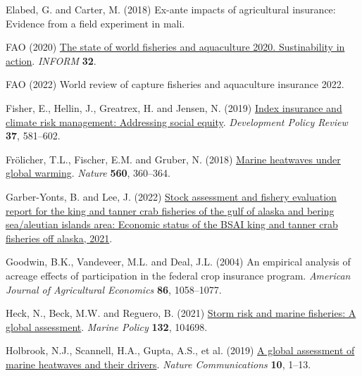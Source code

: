\documentclass[
  letterpaper,
  DIV=11,
  numbers=noendperiod]{scrartcl}
\newlength{\cslhangindent}
\newlength{\cslentryspacingunit} %
\newenvironment{CSLReferences}[2] %
 {%
  \setlength{\parindent}{0pt}
  \ifodd #1
  \let\oldpar\par
  \def\par{\hangindent=\cslhangindent\oldpar}
  \fi
  \setlength{\parskip}{#2\cslentryspacingunit}
 }%
 {}
\theoremstyle{plain}
\theoremstyle{plain}
\theoremstyle{remark}
\begin{document}
\begin{CSLReferences}{1}{0}
\leavevmode{}%
Elabed, G. and Carter, M. (2018) Ex-ante impacts of agricultural
insurance: Evidence from a field experiment in mali.

\leavevmode{}%
FAO (2020) \href{https://doi.org/10.4060/ca9229en}{The state of world
fisheries and aquaculture 2020. Sustinability in action}. \emph{INFORM}
\textbf{32}.

\leavevmode{}%
FAO (2022) World review of capture fisheries and aquaculture insurance
2022.

\leavevmode{}%
Fisher, E., Hellin, J., Greatrex, H. and Jensen, N. (2019)
\href{https://doi.org/10.1111/dpr.12387}{Index insurance and climate
risk management: Addressing social equity}. \emph{Development Policy
Review} \textbf{37}, 581--602.

\leavevmode{}%
Frölicher, T.L., Fischer, E.M. and Gruber, N. (2018)
\href{https://doi.org/10.1038/s41586-018-0383-9}{Marine heatwaves under
global warming}. \emph{Nature} \textbf{560}, 360--364.

\leavevmode{}%
Garber-Yonts, B. and Lee, J. (2022)
\href{http://www.afsc.noaa.gov/refm/Socioeconomics/SAFE/default.php}{Stock
assessment and fishery evaluation report for the king and tanner crab
fisheries of the gulf of alaska and bering sea/aleutian islands area:
Economic status of the BSAI king and tanner crab fisheries off alaska,
2021}.

\leavevmode{}%
Goodwin, B.K., Vandeveer, M.L. and Deal, J.L. (2004) An empirical
analysis of acreage effects of participation in the federal crop
insurance program. \emph{American Journal of Agricultural Economics}
\textbf{86}, 1058--1077.

\leavevmode{}%
Heck, N., Beck, M.W. and Reguero, B. (2021)
\href{https://doi.org/10.1016/j.marpol.2021.104698}{Storm risk and
marine fisheries: A global assessment}. \emph{Marine Policy}
\textbf{132}, 104698.

\leavevmode{}%
Holbrook, N.J., Scannell, H.A., Gupta, A.S., et al. (2019)
\href{https://doi.org/10.1038/s41467-019-10206-z}{A global assessment of
marine heatwaves and their drivers}. \emph{Nature Communications}
\textbf{10}, 1--13.


\end{CSLReferences}
\end{document}
